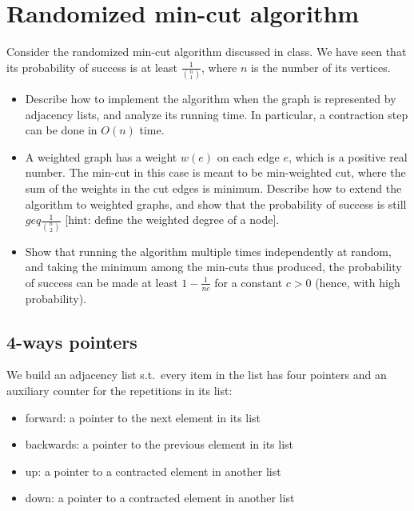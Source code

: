 \section{Randomized min-cut algorithm}

Consider the randomized min-cut algorithm discussed in class.
We have seen that its probability of success is at least $\frac{1}{{{n} \choose {1}}}$,
where $n$ is the number of its vertices.

\begin{itemize}
\item Describe how to implement the algorithm when the graph is represented by adjacency
lists, and analyze its running time.
In particular, a contraction step can be done in $O(n)$ time.
\item A weighted graph has a weight $w(e)$ on each edge $e$, which is a positive
real number.
The min-cut in this case is meant to be min-weighted cut, where the sum of the weights
in the cut edges is minimum.
Describe how to extend the algorithm to weighted graphs, and show that the probability
of success is still $geq \frac{1}{{{n} \choose {2}}}$ [hint: define the weighted degree
of a node].
\item Show that running the algorithm multiple times independently at random, and
taking the minimum among the min-cuts thus produced, the probability of success
can be made at least $1 - \frac{1}{nc}$ for a constant $c > 0$
(hence, with high probability).
\end{itemize}

\subsection{4-ways pointers}

We build an adjacency list s.t.\ every item in the list has four pointers and an
auxiliary counter for the repetitions in its list:
\begin{itemize}
\item forward: a pointer to the next element in its list
\item backwards: a pointer to the previous element in its list
\item up: a pointer to a contracted element in another list
\item down: a pointer to a contracted element in another list
\end{itemize}

